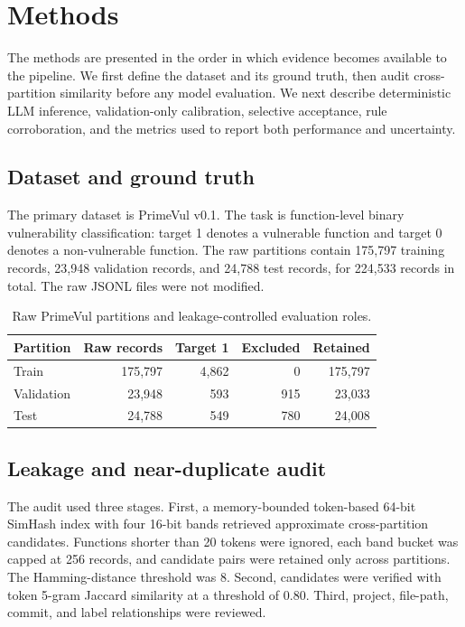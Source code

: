 \documentclass[pdflatex,sn-mathphys-num]{sn-jnl}
\begin{document}
\section{Methods}\label{sec:methods}

The methods are presented in the order in which evidence becomes available to the pipeline. We first define the dataset and its ground truth, then audit cross-partition similarity before any model evaluation. We next describe deterministic LLM inference, validation-only calibration, selective acceptance, rule corroboration, and the metrics used to report both performance and uncertainty.

\subsection{Dataset and ground truth}

The primary dataset is PrimeVul v0.1. The task is function-level binary vulnerability classification: target 1 denotes a vulnerable function and target 0 denotes a non-vulnerable function. The raw partitions contain 175,797 training records, 23,948 validation records, and 24,788 test records, for 224,533 records in total. The raw JSONL files were not modified.

\begin{table}[htbp]
\caption{Raw PrimeVul partitions and leakage-controlled evaluation roles.}\label{tab:dataset}
\centering
\begin{tabular}{@{}lrrrr@{}}
\toprule
Partition & Raw records & Target 1 & Excluded & Retained\\
\midrule
Train & 175,797 & 4,862 & 0 & 175,797\\
Validation & 23,948 & 593 & 915 & 23,033\\
Test & 24,788 & 549 & 780 & 24,008\\
\bottomrule
\end{tabular}
\end{table}

\subsection{Leakage and near-duplicate audit}

The audit used three stages. First, a memory-bounded token-based 64-bit SimHash index with four 16-bit bands retrieved approximate cross-partition candidates. Functions shorter than 20 tokens were ignored, each band bucket was capped at 256 records, and candidate pairs were retained only across partitions. The Hamming-distance threshold was 8. Second, candidates were verified with token 5-gram Jaccard similarity at a threshold of 0.80. Third, project, file-path, commit, and label relationships were reviewed.
\end{document}
